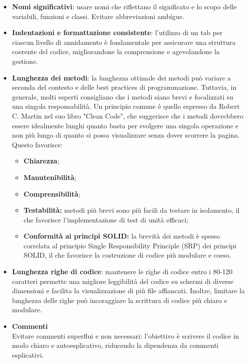 \begin{itemize}
    \item \textbf{Nomi significativi}: usare nomi che riflettano il significato e lo scopo delle variabili, funzioni e classi. Evitare abbreviazioni ambigue.
    \item \textbf{Indentazioni e formattazione consistente}: l'utilizzo di un tab per ciascun livello di annidamento è fondamentale per assicurare una struttura coerente del codice, migliorandone la comprensione e agevolandone la gestione.
    \item \textbf{Lunghezza dei metodi}: la lunghezza ottimale dei metodi può variare a seconda del contesto e delle best practices di programmazione. Tuttavia, in generale, molti esperti consigliano che i metodi siano brevi e focalizzati su una singola responsabilità. Un principio comune è quello espresso da Robert C. Martin nel suo libro "Clean Code", che suggerisce che i metodi dovrebbero essere idealmente lunghi quanto basta per svolgere una singola operazione e non più lungo di quanto si possa visualizzare senza dover scorrere la pagina. \\
    Questo favorisce:
    \begin{itemize}
        \item \textbf{Chiarezza};
        \item \textbf{Manutenibilità};
        \item \textbf{Comprensibilità};
        \item \textbf{Testabilità:} metodi più brevi sono più facili da testare in isolamento, il che favorisce l'implementazione di test di unità efficaci;
        \item \textbf{Conformità ai principi SOLID:} la brevità dei metodi è spesso correlata al principio Single Responsibility Principle (SRP) dei principi SOLID, il che favorisce la costruzione di codice più modulare e coeso.
    \end{itemize} 
    \item \textbf{Lunghezza righe di codice}: mantenere le righe di codice entro i 80-120 caratteri permette una migliore leggibilità del codice su schermi di diverse dimensioni e facilita la visualizzazione di più file affiancati. Inoltre, limitare la lunghezza delle righe può incoraggiare la scrittura di codice più chiaro e modulare.
    \item \textbf{Commenti} \\
    Evitare commenti superflui e non necessari: l'obiettivo è scrivere il codice in modo chiaro e autoesplicativo, riducendo la dipendenza da commenti esplicativi.
\end{itemize}

